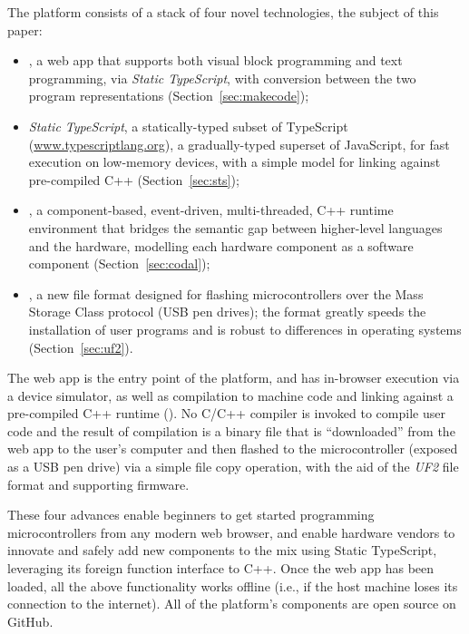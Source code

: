 The platform consists of a stack of four novel technologies, the subject of
this paper:
\begin{itemize}
\item \emph{\MCN}, a web app that supports both visual block programming and text programming,
via \emph{Static TypeScript}, with conversion between the two program representations (Section~\ref{sec:makecode});

\item \emph{Static TypeScript}, a statically-typed subset of TypeScript (\url{www.typescriptlang.org}),
a gradually-typed superset of JavaScript, for fast execution on low-memory devices, with
a simple model for linking against pre-compiled C++ (Section~\ref{sec:sts});

\item \emph{\CO}, a component-based, event-driven, multi-threaded, C++ runtime environment that bridges the semantic gap between higher-level languages and the hardware,
modelling each hardware component as a software component (Section~\ref{sec:codal});

\item \emph{\UFN}, a new file format designed for flashing microcontrollers
over the Mass Storage Class protocol (USB pen drives); the format greatly speeds the installation of user
programs and is robust to differences in operating systems (Section~\ref{sec:uf2}).
\end{itemize}
The \MC web app is the entry point of the platform, and has in-browser execution via a device simulator, as well as compilation to machine code and linking against a
pre-compiled C++ runtime (\emph{\CON}). No C/C++ compiler is invoked to compile user code and the result of compilation is a binary file that is ``downloaded'' from the web app to the user's
computer and then flashed to the microcontroller (exposed as a USB pen drive)
via a simple file copy operation,  with the aid of the \emph{UF2} file format and supporting firmware.

These four advances enable beginners to get started programming microcontrollers from
any modern web browser, and enable hardware vendors to innovate and safely add new
components to the mix using Static TypeScript, leveraging its
foreign function interface to C++.
Once the web app has been loaded, all the above functionality works offline
(i.e., if the host machine loses its connection
to the internet). All of the platform's components are open source on GitHub.

